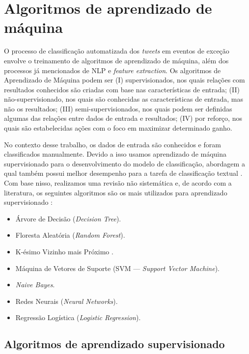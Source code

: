 \documentclass[
	12pt,				%
	oneside,			%
	a4paper,			%
	english,			%
	brazil				%
	]{abntex2ppgsi}
\begin{document}
{\section{Algoritmos de aprendizado de máquina}
\label{classification}

O processo de classificação automatizada dos \textit{tweets} em eventos de exceção envolve o treinamento de algoritmos de aprendizado de máquina, além dos processos já mencionados de NLP e \textit{feature extraction}. Os algoritmos de Aprendizado de Máquina podem ser (I) supervisionados, nos quais relações com resultados conhecidos são criadas com base nas características de entrada; (II) não-supervisionado, nos quais são conhecidas as características de entrada, mas não os resultados; (III) semi-supervisionados, nos quais podem ser definidas algumas das relações entre dados de entrada e resultados; (IV) por reforço, nos quais são estabelecidas ações com o foco em maximizar determinado ganho.

No contexto desse trabalho, os dados de entrada são conhecidos e foram classificados manualmente. Devido a isso usamos aprendizado de máquina supervisionado para o desenvolvimento do modelo de classificação, abordagem a qual também possui melhor desempenho para a tarefa de classificação textual \cite{dwivedi2016automatic}.  Com base nisso, realizamos uma revisão não sistemática e, de acordo com a literatura, os seguintes algoritmos são os mais utilizados para aprendizado supervisionado \cite{kotsiantis2007supervised, dwivedi2016automatic, narayanan2017survey}:

\begin{itemize}
\item Árvore de Decisão (\textit{Decision Tree}).
\item Floresta Aleatória (\textit{Random Forest}).
\item K-ésimo Vizinho mais Próximo .
\item Máquina de Vetores de Suporte ({SVM --- \textit{Support Vector Machine}}).
\item \textit{Naive Bayes}.
\item Redes Neurais (\textit{Neural Networks}).
\item Regressão Logística (\textit{Logistic Regression}).
\end{itemize}

\subsection{Algoritmos de aprendizado supervisionado}
\label{supervisionedLearning}

}
\end{document}
